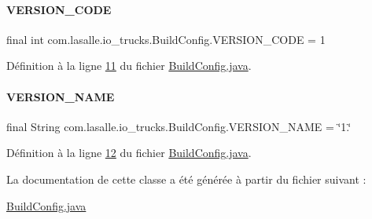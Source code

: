 \paragraph{\texorpdfstring{V\+E\+R\+S\+I\+O\+N\+\_\+\+C\+O\+DE}{VERSION\_CODE}}
{\footnotesize\ttfamily final int com.\+lasalle.\+io\+\_\+trucks.\+Build\+Config.\+V\+E\+R\+S\+I\+O\+N\+\_\+\+C\+O\+DE = 1\hspace{0.3cm}{\ttfamily [static]}}



Définition à la ligne \hyperlink{_build_config_8java_source_l00011}{11} du fichier \hyperlink{_build_config_8java_source}{Build\+Config.\+java}.

\mbox{\label{classcom_1_1lasalle_1_1io__trucks_1_1_build_config_a0efad994a9b900e7436c53f5714760ab}} 
\paragraph{\texorpdfstring{V\+E\+R\+S\+I\+O\+N\+\_\+\+N\+A\+ME}{VERSION\_NAME}}
{\footnotesize\ttfamily final String com.\+lasalle.\+io\+\_\+trucks.\+Build\+Config.\+V\+E\+R\+S\+I\+O\+N\+\_\+\+N\+A\+ME = \char`\"{}1.\char`\"{}\hspace{0.3cm}{\ttfamily [static]}}



Définition à la ligne \hyperlink{_build_config_8java_source_l00012}{12} du fichier \hyperlink{_build_config_8java_source}{Build\+Config.\+java}.



La documentation de cette classe a été générée à partir du fichier suivant \+:\begin{DoxyCompactItemize}
\item 
\hyperlink{_build_config_8java}{Build\+Config.\+java}\end{DoxyCompactItemize}
